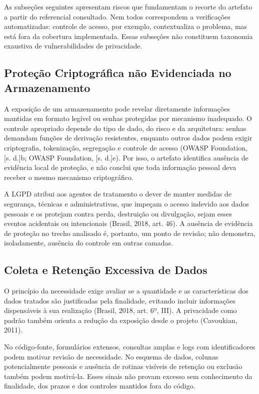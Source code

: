 \documentclass[12pt,a4paper,oneside]{report}
\begin{document}
As subseções seguintes apresentam riscos que fundamentam o recorte do artefato a partir do referencial consultado. Nem todos correspondem a verificações automatizadas: controle de acesso, por exemplo, contextualiza o problema, mas está fora da cobertura implementada. Essas subseções não constituem taxonomia exaustiva de vulnerabilidades de privacidade.

\subsection{Proteção Criptográfica não Evidenciada no Armazenamento}

A exposição de um armazenamento pode revelar diretamente informações mantidas em formato legível ou senhas protegidas por mecanismo inadequado. O controle apropriado depende do tipo de dado, do risco e da arquitetura: senhas demandam funções de derivação resistentes, enquanto outros dados podem exigir criptografia, tokenização, segregação e controle de acesso (OWASP Foundation, [s. d.]b; OWASP Foundation, [s. d.]e). Por isso, o artefato identifica ausência de evidência local de proteção, e não conclui que toda informação pessoal deva receber o mesmo mecanismo criptográfico.

A LGPD atribui aos agentes de tratamento o dever de manter medidas de segurança, técnicas e administrativas, que impeçam o acesso indevido aos dados pessoais e os protejam contra perda, destruição ou divulgação, sejam esses eventos acidentais ou intencionais (Brasil, 2018, art. 46). A ausência de evidência de proteção no trecho analisado é, portanto, um ponto de revisão; não demonstra, isoladamente, ausência do controle em outras camadas.

\subsection{Coleta e Retenção Excessiva de Dados}

O princípio da necessidade exige avaliar se a quantidade e as características dos dados tratados são justificadas pela finalidade, evitando incluir informações dispensáveis à sua realização (Brasil, 2018, art. 6º, III). A privacidade como padrão também orienta a redução da exposição desde o projeto (Cavoukian, 2011).

No código-fonte, formulários extensos, consultas amplas e logs com identificadores podem motivar revisão de necessidade. No esquema de dados, colunas potencialmente pessoais e ausência de rotinas visíveis de retenção ou exclusão também podem motivá-la. Esses sinais não provam excesso sem conhecimento da finalidade, dos prazos e dos controles mantidos fora do código.
\end{document}
